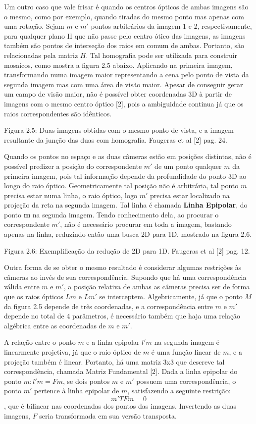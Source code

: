 Um outro caso que vale frisar é quando os centros ópticos de ambas imagens são o mesmo, como por exemplo, quando tiradas do mesmo ponto mas apenas com uma rotação. Sejam $m$ e $m'$ pontos arbitrários da imagem 1 e 2, respectivamente, para qualquer plano II que não passe pelo centro ótico das imagens, as imagens também são pontos de interseção dos raios em comum de ambas. Portanto, são relacionadas pela matriz $H$. Tal homografia pode ser utilizada para construir mosaicos, como mostra a figura 2.5 abaixo. Aplicando na primeira imagem, transformando numa imagem maior representando a cena pelo ponto de vista da segunda imagem mas com uma área de visão maior. Apesar de conseguir gerar um campo de visão maior, não é possível obter coordenadas 3D à partir de imagens com o mesmo centro óptico [2], pois a ambiguidade continua já que os raios correspondentes são idênticos.

Figura 2.5: Duas imagens obtidas com o mesmo ponto de vista, e a imagem resultante da junção das duas com homografia. Faugeras et al [2] pag. 24.

Quando os pontos no espaço e as duas câmeras estão em posições distintas, não é possível predizer a posição do correspondente $m'$ de um ponto qualquer $m$ da primeira imagem, pois tal informação depende da profundidade do ponto 3D ao longo do raio óptico. Geometricamente tal posição não é arbitrária, tal ponto $m$ precisa estar numa linha, o raio óptico, logo $m'$ precisa estar localizado na projeção da reta na segunda imagem. Tal linha é chamada \textbf{Linha Epipolar}, do ponto \textbf{m} na segunda imagem. Tendo conhecimento dela, ao procurar o correspondente $m'$, não é necessário procurar em toda a imagem, bastando apenas na linha, reduzindo então uma busca 2D para 1D, mostrado na figura 2.6.


Figura 2.6: Exemplificação da redução de 2D para 1D. Faugeras et al [2] pag. 12.

Outra forma de se obter o mesmo resultado é considerar algumas restrições às câmeras ao invés de sua correspondência. Supondo que há uma correspondência válida entre $m$ e $m'$, a posição relativa de ambas as câmeras precisa ser de forma que os raios ópticos $Lm$ e $Lm'$ se interceptem. Algebricamente, já que o ponto $M$ da figura 2.5 depende de três coordenadas, e a correspondência entre $m$ e $m'$ depende no total de 4 parâmetros, é necessário também que haja uma relação algébrica entre as coordenadas de $m$ e $m'$.

A relação entre o ponto $m$ e a linha epipolar $l'm$ na segunda imagem é linearmente projetiva, já que o raio óptico de $m$ é uma função linear de $m$, e a projeção também é linear. Portanto, há uma matriz 3x3 que descreve tal correspondência, chamada Matriz Fundamental [2]. Dada a linha epipolar do ponto $m: l'm = Fm$, se dois pontos $m$ e $m'$ possuem uma correspondência, o ponto $m'$ pertence à linha epipolar de $m$, satisfazendo a seguinte restrição: 
$$m'TFm = 0$$, que é bilinear nas coordenadas dos pontos das imagens. Invertendo as duas imagens, $F$ seria transformada em sua versão transposta.

